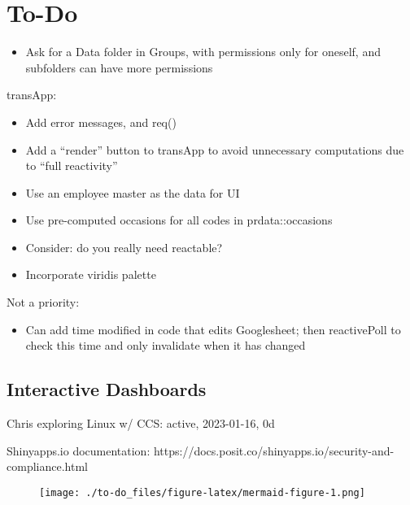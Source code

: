 \documentclass[
  letterpaper,
  DIV=11,
  numbers=noendperiod,
  oneside]{scrreprt}
\providecommand{\tightlist}{%
  \setlength{\itemsep}{0pt}\setlength{\parskip}{0pt}}\usepackage{longtable,booktabs,array}
\begin{document}

\hypertarget{to-do}{%
\chapter{To-Do}\label{to-do}}

\begin{itemize}
\tightlist
\item
  Ask for a Data folder in Groups, with permissions only for oneself,
  and subfolders can have more permissions
\end{itemize}

transApp:

\begin{itemize}
\tightlist
\item
  Add error messages, and req()
\item
  Add a ``render'' button to transApp to avoid unnecessary computations
  due to ``full reactivity''
\item
  Use an employee master as the data for UI
\item
  Use pre-computed occasions for all codes in prdata::occasions
\item
  Consider: do you really need reactable?
\item
  Incorporate viridis palette
\end{itemize}

Not a priority:

\begin{itemize}
\tightlist
\item
  Can add time modified in code that edits Googlesheet; then
  reactivePoll to check this time and only invalidate when it has
  changed
\end{itemize}

\hypertarget{interactive-dashboards}{%
\section{Interactive Dashboards}\label{interactive-dashboards}}

Chris exploring Linux w/ CCS: active, 2023-01-16, 0d

Shinyapps.io documentation:
https://docs.posit.co/shinyapps.io/security-and-compliance.html

\begin{figure}[H]

{\centering \texttt{[image: ./to-do\_files/figure-latex/mermaid-figure-1.png]}

}

\end{figure}
\end{document}
